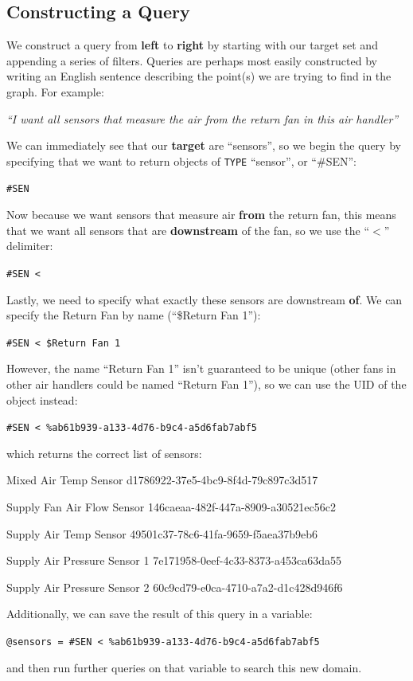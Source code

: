 \documentclass{article}
\begin{document}
\subsection{Constructing a Query} %
\label{sub:constructing_a_query}
We construct a query from {\bf left} to {\bf right} by starting with our target set and appending a series of filters. Queries are perhaps most easily constructed by writing an English sentence describing the point(s) we are trying to find in the graph. For example:
\begin{center}\emph{``I want all sensors that measure the air from the return fan in this air handler''}\end{center}
We can immediately see that our {\bf target} are ``sensors'', so we begin the query by specifying that we want to return objects of \verb+TYPE+ ``sensor'', or ``\#SEN'':
\begin{center}\verb+#SEN+\end{center}
Now because we want sensors that measure air {\bf from} the return fan, this means that we want all sensors that are {\bf downstream} of the fan, so we use the ``$<$'' delimiter:
\begin{center}\verb+#SEN <+\end{center}
Lastly, we need to specify what exactly these sensors are downstream {\bf of}. We can specify the Return Fan by name (``\$Return Fan 1''):
\begin{center}\verb+#SEN < $Return Fan 1+\end{center}
However, the name ``Return Fan 1'' isn't guaranteed to be unique (other fans in other air handlers could be named ``Return Fan 1''), so we can use the UID of the object instead:
\begin{center}\verb+#SEN < %ab61b939-a133-4d76-b9c4-a5d6fab7abf5+\end{center}
which returns the correct list of sensors:
\begin{center}
	Mixed Air Temp Sensor d1786922-37e5-4bc9-8f4d-79c897c3d517
	
	Supply Fan Air Flow Sensor 146caeaa-482f-447a-8909-a30521ec56c2
	
	Supply Air Temp Sensor 49501c37-78c6-41fa-9659-f5aea37b9eb6
	
	Supply Air Pressure Sensor 1 7e171958-0eef-4c33-8373-a453ca63da55
	
	Supply Air Pressure Sensor 2 60c9cd79-e0ca-4710-a7a2-d1c428d946f6
\end{center}
Additionally, we can save the result of this query in a variable:
\begin{center}\verb+@sensors = #SEN < %ab61b939-a133-4d76-b9c4-a5d6fab7abf5+\end{center}
and then run further queries on that variable to search this new domain.
\end{document}
